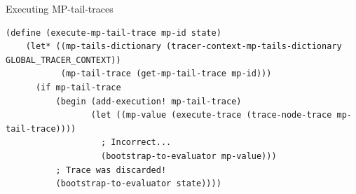 \documentclass{beamer}
\begin{document}
\begin{frame}[fragile]{Executing MP-tail-traces}
\begin{lstlisting}[basicstyle = \scriptsize\ttfamily, escapechar = £]
(define (execute-mp-tail-trace mp-id state)
    (let* ((mp-tails-dictionary (tracer-context-mp-tails-dictionary GLOBAL_TRACER_CONTEXT))
           (mp-tail-trace (get-mp-tail-trace mp-id)))
      (if mp-tail-trace
          (begin (add-execution! mp-tail-trace)
                 (let ((mp-value (execute-trace (trace-node-trace mp-tail-trace))))
                   ; Incorrect...
                   (bootstrap-to-evaluator mp-value)))
          ; Trace was discarded!
          (bootstrap-to-evaluator state))))
\end{lstlisting}
\end{frame}
\end{document}
